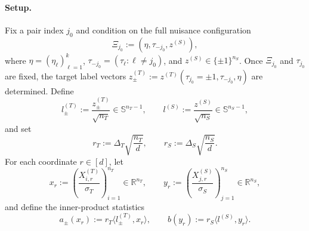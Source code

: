 \documentclass[10pt]{article}
\newcommand{\R}{\mathbb R}
\newcommand{\ip}[2]{\langle #1,#2\rangle}
\newcommand{\sphere}[1]{\mathbb S^{#1}}
\newcommand{\trg}{T}
\newcommand{\nT}{n_{\trg}}
\newcommand{\sigmaT}{\sigma_{\trg}}
\newcommand{\Xtar}{X^{(\trg)}}
\newcommand{\ztar}{z^{(\trg)}}
\newcommand{\DeltaT}{\Delta_{\trg}}
\newcommand{\src}{S}
\newcommand{\nS}{n_{\src}}
\newcommand{\sigmaS}{\sigma_{\src}}
\newcommand{\Xsrc}{X^{(\src)}}
\newcommand{\zsrc}{z^{(\src)}}
\newcommand{\DeltaS}{\Delta_{\src}}
\begin{document}
\paragraph{Setup.}
Fix a pair index $j_0$ and condition on the full nuisance configuration
\begin{equation}\label{eq:def-Xi_k}
    \Xi_{j_0} := (\eta,\tau_{-j_0},\zsrc),
\end{equation}
where $\eta=(\eta_\ell)_{\ell=1}^k$, $\tau_{-j_0}=(\tau_\ell:\ell\neq j_0)$, and
$\zsrc\in\{\pm1\}^{\nS}$.  Once $\Xi_{j_0}$ and $\tau_{j_0}$ are fixed, the
target label vectors $\ztar_\pm:=\ztar(\tau_{j_0}=\pm1,\tau_{-j_0},\eta)$ are
determined.  Define
\begin{equation}\label{eq:def-l-defs}
    l^{(\trg)}_\pm := \frac{\ztar_\pm}{\sqrt{\nT}}\in\sphere{\nT-1},
    \qquad
    l^{(\src)} := \frac{\zsrc}{\sqrt{\nS}}\in\sphere{\nS-1},
\end{equation}
and set
\begin{equation}\label{eq:def-rT-rS}
    r_T := \DeltaT\sqrt{\frac{\nT}{d}},
    \qquad
    r_S := \DeltaS\sqrt{\frac{\nS}{d}}.
\end{equation}
For each coordinate $r\in[d]$, let
\begin{equation}\label{eq:def-xr-yr}
    x_r := \left(\frac{\Xtar_{i,r}}{\sigmaT}\right)_{i=1}^{\nT}\in\R^{\nT},
    \qquad
    y_r := \left(\frac{\Xsrc_{j,r}}{\sigmaS}\right)_{j=1}^{\nS}\in\R^{\nS},
\end{equation}
and define the inner-product statistics
\begin{equation}\label{eq:def-a-b}
    a_\pm(x_r) := r_T\ip{l^{(\trg)}_\pm}{x_r},
    \qquad
    b(y_r) := r_S\ip{l^{(\src)}}{y_r}.
\end{equation}
\end{document}
